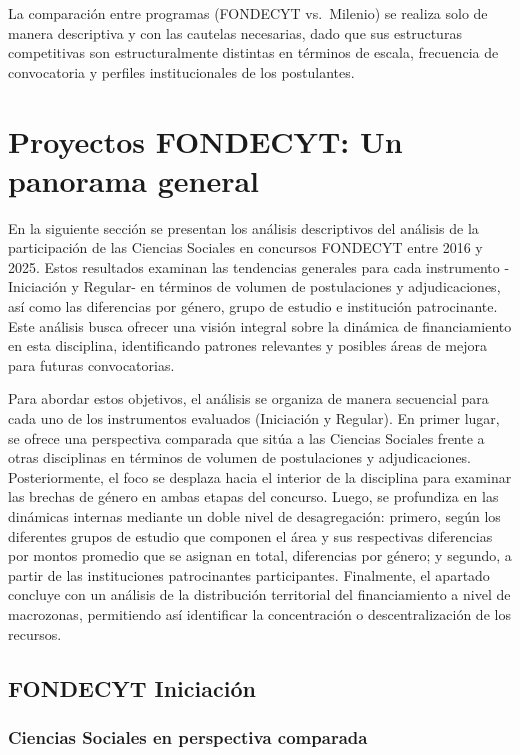 \documentclass[
  12pt,
  letterpaper,
]{article}
\begin{document}
La comparación entre programas (FONDECYT vs.~Milenio) se realiza solo de
manera descriptiva y con las cautelas necesarias, dado que sus
estructuras competitivas son estructuralmente distintas en términos de
escala, frecuencia de convocatoria y perfiles institucionales de los
postulantes.

\section{Proyectos FONDECYT: Un panorama
general}\label{proyectos-fondecyt-un-panorama-general}

En la siguiente sección se presentan los análisis descriptivos del
análisis de la participación de las Ciencias Sociales en concursos
FONDECYT entre 2016 y 2025. Estos resultados examinan las tendencias
generales para cada instrumento -Iniciación y Regular- en términos de
volumen de postulaciones y adjudicaciones, así como las diferencias por
género, grupo de estudio e institución patrocinante. Este análisis busca
ofrecer una visión integral sobre la dinámica de financiamiento en esta
disciplina, identificando patrones relevantes y posibles áreas de mejora
para futuras convocatorias.

Para abordar estos objetivos, el análisis se organiza de manera
secuencial para cada uno de los instrumentos evaluados (Iniciación y
Regular). En primer lugar, se ofrece una perspectiva comparada que sitúa
a las Ciencias Sociales frente a otras disciplinas en términos de
volumen de postulaciones y adjudicaciones. Posteriormente, el foco se
desplaza hacia el interior de la disciplina para examinar las brechas de
género en ambas etapas del concurso. Luego, se profundiza en las
dinámicas internas mediante un doble nivel de desagregación: primero,
según los diferentes grupos de estudio que componen el área y sus
respectivas diferencias por montos promedio que se asignan en total,
diferencias por género; y segundo, a partir de las instituciones
patrocinantes participantes. Finalmente, el apartado concluye con un
análisis de la distribución territorial del financiamiento a nivel de
macrozonas, permitiendo así identificar la concentración o
descentralización de los recursos.

\subsection{FONDECYT Iniciación}\label{fondecyt-iniciaciuxf3n}

\subsubsection{Ciencias Sociales en perspectiva
comparada}\label{ciencias-sociales-en-perspectiva-comparada}
\end{document}
